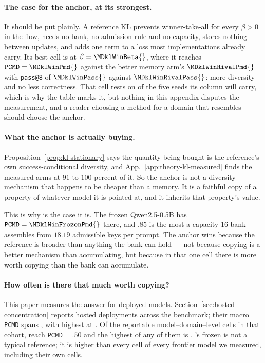 \documentclass{article}
\newcommand{\1}{\mathbf 1}
\newcommand{\pmd}{\texttt{PCMD}}
\theoremstyle{remark}
\theoremstyle{definition}
\theoremstyle{plain}
\begin{document}
\paragraph{The case for the anchor, at its strongest.}
It should be put plainly. A reference KL prevents winner-take-all for every
$\beta>0$ in the flow, needs no bank, no admission rule and no capacity, stores
nothing between updates, and adds one term to a loss most implementations
already carry. Its best cell is \MDklWinDomain{} at $\beta=\MDklWinBeta{}$,
where it reaches $\pmd{}=\MDklWinPmd{}$ against the better memory arm's
$\MDklWinRivalPmd{}$ with \texttt{pass@8} of $\MDklWinPass{}$ against
$\MDklWinRivalPass{}$: more diversity and no less correctness. That cell rests on
\MDklWinSeeds{} of the five seeds its column will carry, which is why the table
marks it, but nothing in this appendix disputes the measurement, and a reader
choosing a method for a domain that resembles \MDklWinDomain{} should choose
the anchor.

\paragraph{What the anchor is actually buying.}
Proposition~\ref{prop:kl-stationary} says the quantity being bought is the
reference's own success-conditional diversity, and
App.~\ref{app:theory-kl-measured} finds the measured arms at $91$ to $100$
percent of it. So the anchor is not a diversity mechanism that happens to be
cheaper than a memory. It is a faithful copy of a property of whatever model
it is pointed at, and it inherits that property's value.

This is why \MDklWinDomain{} is the case it is. The frozen Qwen2.5-0.5B has
$\pmd{}=\MDklWinFrozenPmd{}$ there, and $.85$ is the most a capacity-16 bank assembles from
$18.19$ admissible keys per prompt. The anchor wins because the reference is
broader than anything the bank can hold --- not because copying is a better
mechanism than accumulating, but because in that one cell there is more worth
copying than the bank can accumulate.

\paragraph{How often is there that much worth copying?}
This paper measures the answer for deployed models.
Section~\ref{sec:hosted-concentration} reports \MDklHostedModels{} hosted
deployments across the benchmark; their macro \pmd{} spans
\MDklHostedRange{}, with \MDklHostedHiModel{} highest at \MDklHostedHi{}. Of
the \MDklHostedCells{} reportable model--domain--level cells in that cohort,
\MDklHostedCellsHalf{} reach $\pmd{}=.50$ and the highest of any of them is
\MDklHostedCellMax{}. \MDklTopFrozenDomain{}'s frozen \MDklTopFrozenPmd{} is
not a typical reference; it is higher than every cell of every frontier model
we measured, including their own \MDklTopFrozenDomain{} cells.
\end{document}
